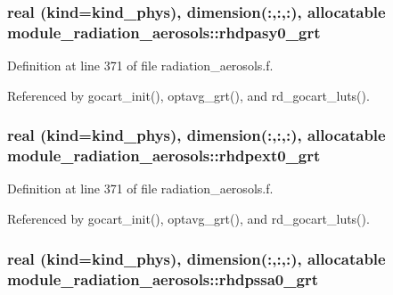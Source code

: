 \subsubsection[{\texorpdfstring{rhdpasy0\+\_\+grt}{rhdpasy0_grt}}]{\setlength{\rightskip}{0pt plus 5cm}real (kind=kind\+\_\+phys), dimension(\+:,\+:,\+:), allocatable module\+\_\+radiation\+\_\+aerosols\+::rhdpasy0\+\_\+grt\hspace{0.3cm}{\ttfamily [private]}}\hypertarget{namespacemodule__radiation__aerosols_ab5a0bbefbfed6b393f0abad26e6e4d04}{}\label{namespacemodule__radiation__aerosols_ab5a0bbefbfed6b393f0abad26e6e4d04}


Definition at line 371 of file radiation\+\_\+aerosols.\+f.



Referenced by gocart\+\_\+init(), optavg\+\_\+grt(), and rd\+\_\+gocart\+\_\+luts().

\subsubsection[{\texorpdfstring{rhdpext0\+\_\+grt}{rhdpext0_grt}}]{\setlength{\rightskip}{0pt plus 5cm}real (kind=kind\+\_\+phys), dimension(\+:,\+:,\+:), allocatable module\+\_\+radiation\+\_\+aerosols\+::rhdpext0\+\_\+grt\hspace{0.3cm}{\ttfamily [private]}}\hypertarget{namespacemodule__radiation__aerosols_a35a5c7b67a3cf11c5016a693e115d384}{}\label{namespacemodule__radiation__aerosols_a35a5c7b67a3cf11c5016a693e115d384}


Definition at line 371 of file radiation\+\_\+aerosols.\+f.



Referenced by gocart\+\_\+init(), optavg\+\_\+grt(), and rd\+\_\+gocart\+\_\+luts().

\subsubsection[{\texorpdfstring{rhdpssa0\+\_\+grt}{rhdpssa0_grt}}]{\setlength{\rightskip}{0pt plus 5cm}real (kind=kind\+\_\+phys), dimension(\+:,\+:,\+:), allocatable module\+\_\+radiation\+\_\+aerosols\+::rhdpssa0\+\_\+grt\hspace{0.3cm}{\ttfamily [private]}}\hypertarget{namespacemodule__radiation__aerosols_a40d680662eadf30221997dadcce734b1}{}\label{namespacemodule__radiation__aerosols_a40d680662eadf30221997dadcce734b1}


